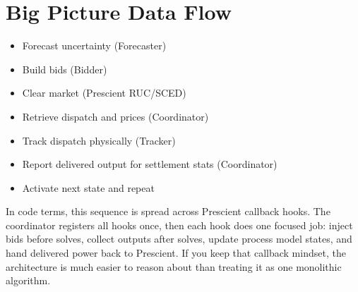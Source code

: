 \documentclass{article}
\begin{document}
\section{Big Picture Data Flow}
\begin{itemize}[leftmargin=*]
  \item Forecast uncertainty (Forecaster)
  \item Build bids (Bidder)
  \item Clear market (Prescient RUC/SCED)
  \item Retrieve dispatch and prices (Coordinator)
  \item Track dispatch physically (Tracker)
  \item Report delivered output for settlement stats (Coordinator)
  \item Activate next state and repeat
\end{itemize}

In code terms, this sequence is spread across Prescient callback hooks. The coordinator registers all hooks once, then each hook does one focused job: inject bids before solves, collect outputs after solves, update process model states, and hand delivered power back to Prescient. If you keep that callback mindset, the architecture is much easier to reason about than treating it as one monolithic algorithm.
\end{document}
